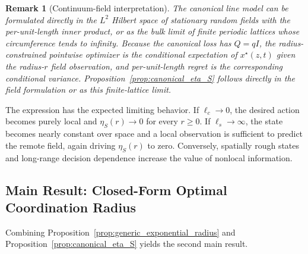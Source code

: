 \documentclass[11pt]{article}
\newtheorem{remark}{Remark}
\begin{document}
\begin{remark}[Continuum-field interpretation]
The canonical line model can be formulated directly in the $L^2$ Hilbert space
of stationary random fields with the per-unit-length inner product, or as the
bulk limit of finite periodic lattices whose circumference tends to infinity.
Because the canonical loss has $Q=qI$, the radius-constrained pointwise
optimizer is the conditional expectation of $x^\star(z,t)$ given the
radius-$r$ field observation, and per-unit-length regret is the corresponding
conditional variance. Proposition~\ref{prop:canonical_eta_S} follows directly
in the field formulation or as this finite-lattice limit.
\end{remark}

The expression has the expected limiting behavior. If
$\ell_c\rightarrow0$, the desired action becomes purely local and
$\eta_S(r)\rightarrow0$ for every $r\ge0$. If
$\ell_s\rightarrow\infty$, the state becomes nearly constant over space and
a local observation is sufficient to predict the remote field, again driving
$\eta_S(r)$ to zero. Conversely, spatially rough states and long-range
decision dependence increase the value of nonlocal information.

\subsection{Main Result: Closed-Form Optimal Coordination Radius}
\label{subsec:main_optimal_radius}

Combining Proposition~\ref{prop:generic_exponential_radius} and
Proposition~\ref{prop:canonical_eta_S} yields the second main result.
\end{document}
